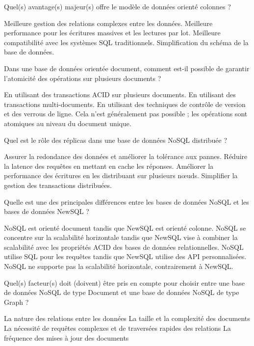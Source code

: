\documentclass[12pt,a4paper,addpoints,answers]{exam}
\begin{document}
\begin{questions}
		\question[1] Quel(s) avantage(s) majeur(s) offre le modèle de données orienté colonnes ?
		\begin{checkboxes}
			\choice Meilleure gestion des relations complexes entre les données.
			\CorrectChoice Meilleure performance pour les écritures massives et les lectures par lot.
			\choice Meilleure compatibilité avec les systèmes SQL traditionnels.
			\choice Simplification du schéma de la base de données.
		\end{checkboxes}
		
		\question[1] Dans une base de données orientée document, comment est-il possible de garantir l'atomicité des opérations sur plusieurs documents ?
		\begin{checkboxes}
			\choice  En utilisant des transactions ACID sur plusieurs documents.
			\choice En utilisant des transactions multi-documents.
			\choice En utilisant des techniques de contrôle de version et des verrous de ligne.
			\CorrectChoice Cela n'est généralement pas possible ; les opérations sont atomiques au niveau du document unique.
		\end{checkboxes}
		
		\question[1] Quel est le rôle des réplicas dans une base de données NoSQL distribuée ?
		\begin{checkboxes}
			\CorrectChoice Assurer la redondance des données et améliorer la tolérance aux pannes.
			\choice Réduire la latence des requêtes en mettant en cache les réponses.
			\choice Améliorer la performance des écritures en les distribuant sur plusieurs nœuds.
			\choice Simplifier la gestion des transactions distribuées.
		\end{checkboxes}
		
		\bonusquestion[1] Quelle est une des principales différences entre les bases de données NoSQL et les bases de données NewSQL ?
		\begin{checkboxes}
			\choice NoSQL est orienté document tandis que NewSQL est orienté colonne.
			\CorrectChoice NoSQL se concentre sur la scalabilité horizontale tandis que NewSQL vise à combiner la scalabilité avec les propriétés ACID des bases de données relationnelles.
			\choice NoSQL utilise SQL pour les requêtes tandis que NewSQL utilise des API personnalisées.
			\choice NoSQL ne supporte pas la scalabilité horizontale, contrairement à NewSQL.
		\end{checkboxes}
		
		\question[1\half] Quel(s) facteur(s) doit (doivent) être pris en compte pour choisir entre une base de données NoSQL de type Document et une base de données NoSQL de type Graph ?
		\begin{checkboxes}
			\CorrectChoice La nature des relations entre les données
			\choice La taille et la complexité des documents
			\CorrectChoice La nécessité de requêtes complexes et de traversées rapides des relations
			\CorrectChoice La fréquence des mises à jour des documents
		\end{checkboxes}
		

\end{questions}
\end{document}
